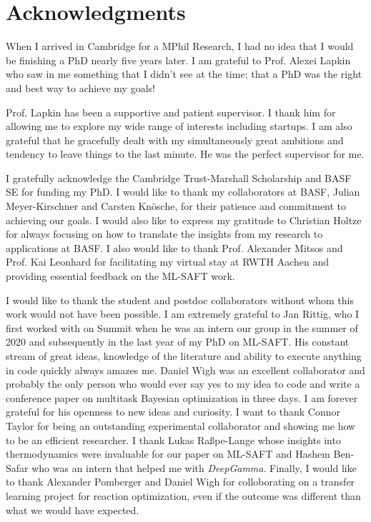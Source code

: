 
\chapter*{Acknowledgments}
When I arrived in Cambridge for a MPhil Research, I had no idea that I would be finishing  a PhD nearly five years later. I am grateful to Prof. Alexei Lapkin who saw in me something that I didn't see at the time; that a PhD was the right and best way to achieve my goals!

Prof. Lapkin has been a supportive and patient supervisor. I thank him for allowing me to explore my wide range of interests including startups. I am also grateful that he gracefully dealt with my simultaneously great ambitions and tendency to leave things to the last minute. He was the perfect supervisor for me.

I gratefully acknowledge the Cambridge Trust-Marshall Scholarship and BASF SE for funding my PhD. I would like to thank my collaborators at BASF, Julian Meyer-Kirschner and Carsten Kn\"osche, for their patience and commitment to achieving our goals. I would also like to express my gratitude to Christian Holtze for always focusing on how to translate the insights from my research to applications at BASF. I also would like to thank Prof. Alexander Mitsos and Prof. Kai Leonhard for facilitating my virtual stay at RWTH Aachen and providing essential feedback on the ML-SAFT work. 

I would like to thank the student and postdoc collaborators without whom this work would not have been possible. I am extremely grateful to Jan Rittig, who I first worked with on Summit when he was an intern our group in the summer of 2020 and subsequently in the last year of my PhD on ML-SAFT. His constant stream of great ideas, knowledge of the literature and ability to execute anything in code quickly always amazes me. Daniel Wigh was an excellent collaborator and probably the only person who would ever say yes to my idea to code and write a conference paper on multitask Bayesian optimization in three days. I am forever grateful for his openness to new ideas and curiosity. I want to thank Connor Taylor for being an outstanding experimental collaborator and showing me how to be an efficient researcher. I thank Lukas Ra{\ss}pe-Lange whose insights into thermodynamics were invaluable for our paper on ML-SAFT and Hashem Ben-Safar who was an intern that helped me with \textit{DeepGamma}. Finally, I would like to thank Alexander Pomberger and Daniel Wigh for colloborating on a transfer learning project for reaction optimization, even if the outcome was different
than what we would have expected.

